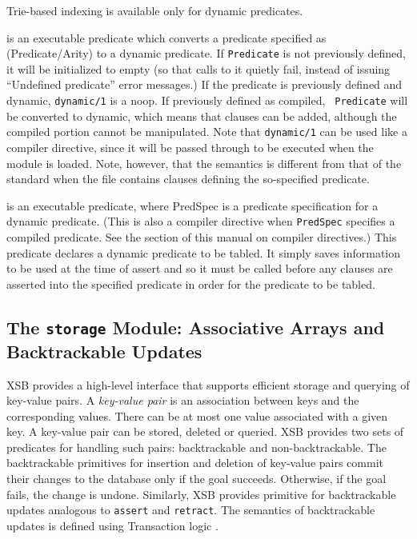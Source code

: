 \begin{description}
\begin{itemize}
Trie-based indexing is available only for dynamic predicates.
\end{itemize}

\label{dynamic/1}
is an executable predicate which converts a predicate specified as
(Predicate/Arity) to a dynamic predicate. If {\tt Predicate} is not
previously defined, it will be initialized to empty (so that calls to
it quietly fail, instead of issuing {\sf ``Undefined predicate''}
error messages.) If the predicate is previously defined and dynamic,
{\tt dynamic/1} is a noop. If previously defined as compiled, {\tt
Predicate} will be converted to dynamic, which means that clauses can
be added, although the compiled portion cannot be manipulated.  Note
that {\tt dynamic/1} can be used like a compiler directive, since it
will be passed through to be executed when the module is loaded. Note,
however, that the semantics is different from that of the standard
\cite{ISO-Prolog} when the file contains clauses defining the
so-specified predicate.

is an executable predicate, where PredSpec is a predicate
specification for a dynamic predicate. (This is also a compiler
directive when {\tt PredSpec} specifies a compiled predicate. See the
section of this manual on compiler directives.) This predicate
declares a dynamic predicate to be tabled. It simply saves information
to be used at the time of assert and so it must be called before any
clauses are asserted into the specified predicate in order for the
predicate to be tabled.

\end{description}


\subsection{The {\tt storage} Module: Associative Arrays and Backtrackable Updates}

\label{storage module}
XSB provides a high-level interface that supports efficient storage and
querying of key-value pairs. A \emph{key-value pair} is an association
between keys and the corresponding values. There can be at most one value
associated with a given key. A key-value pair can be stored, deleted or
queried. XSB provides two sets of predicates for handling such pairs:
backtrackable and non-backtrackable. The backtrackable primitives for
insertion and deletion of key-value pairs commit their changes to the
database only if the goal succeeds. Otherwise, if the goal fails, the
change is undone. Similarly, XSB provides primitive for backtrackable
updates analogous to {\tt assert} and {\tt retract}. The semantics of
backtrackable updates is defined using Transaction logic \cite{BoKi94}.

